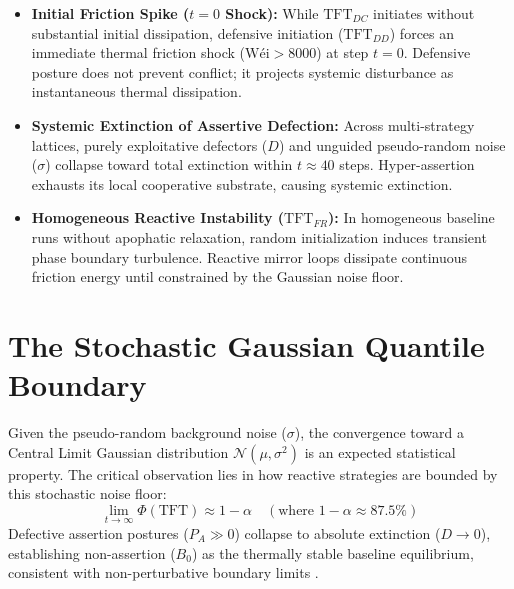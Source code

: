 \documentclass[11pt,a4paper]{article}
\begin{document}
\begin{itemize}
    \item \textbf{Initial Friction Spike ($t=0$ Shock):} While $\text{TFT}_{DC}$ initiates without substantial initial dissipation, defensive initiation ($\text{TFT}_{DD}$) forces an immediate thermal friction shock ($\text{Wéi} > 8000$) at step $t=0$. Defensive posture does not prevent conflict; it projects systemic disturbance as instantaneous thermal dissipation.
    \item \textbf{Systemic Extinction of Assertive Defection:} Across multi-strategy lattices, purely exploitative defectors ($D$) and unguided pseudo-random noise ($\sigma$) collapse toward total extinction within $t \approx 40$ steps. Hyper-assertion exhausts its local cooperative substrate, causing systemic extinction.
    \item \textbf{Homogeneous Reactive Instability ($\text{TFT}_{FR}$):} In homogeneous baseline runs without apophatic relaxation, random initialization induces transient phase boundary turbulence. Reactive mirror loops dissipate continuous friction energy until constrained by the Gaussian noise floor.
\end{itemize}

\section{The Stochastic Gaussian Quantile Boundary}
Given the pseudo-random background noise ($\sigma$), the convergence toward a Central Limit Gaussian distribution $\mathcal{N}(\mu, \sigma^2)$ is an expected statistical property. The critical observation lies in how reactive strategies are bounded by this stochastic noise floor:
\begin{equation}
\lim_{t \to \infty} \Phi(\text{TFT}) \approx 1 - \alpha \quad (\text{where } 1 - \alpha \approx 87.5\%)
\end{equation}
Defective assertion postures ($P_A \gg 0$) collapse to absolute extinction ($D \to 0$), establishing non-assertion ($B_0$) as the thermally stable baseline equilibrium, consistent with non-perturbative boundary limits \cite{nicht_physics_paper_2, nicht_theory_monograph}.



\end{document}
